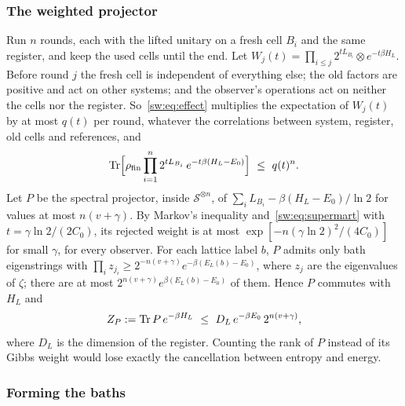 \subsubsection{The weighted projector}

Run $n$ rounds, each with the lifted unitary on a fresh cell $B_i$ and the same register, and keep the used cells until the end. Let $W_j(t)=\prod_{i\le j}2^{tL_{B_i}}\otimes e^{-t\beta H_L}$. Before round $j$ the fresh cell is independent of everything else; the old factors are positive and act on other systems; and the observer's operations act on neither the cells nor the register. So~\eqref{sw:eq:effect} multiplies the expectation of $W_j(t)$ by at most $q(t)$ per round, whatever the correlations between system, register, old cells and references, and
\begin{equation}\label{sw:eq:supermart}
\Tr\Bigl[\rho_{\mathrm{fin}}\prod_{i=1}^n2^{tL_{B_i}}\,e^{-t\beta(H_L-E_0)}\Bigr]\ \le\ q(t)^n.
\end{equation}
Let $P$ be the spectral projector, inside $\mathcal S^{\otimes n}$, of $\sum_iL_{B_i}-\beta(H_L-E_0)/\ln2$ for values at most $n(v+\gamma)$. By Markov's inequality and~\eqref{sw:eq:supermart} with $t=\gamma\ln2/(2C_0)$, its rejected weight is at most $\exp[-n(\gamma\ln2)^2/(4C_0)]$ for small $\gamma$, for every observer. For each lattice label $b$, $P$ admits only bath eigenstrings with $\prod_iz_{j_i}\ge2^{-n(v+\gamma)}e^{-\beta(E_L(b)-E_0)}$, where $z_j$ are the eigenvalues of $\zeta$; there are at most $2^{n(v+\gamma)}e^{\beta(E_L(b)-E_0)}$ of them. Hence $P$ commutes with $H_L$ and
\begin{equation}\label{sw:eq:gibbsvolume}
Z_P:=\operatorname{Tr} P\,e^{-\beta H_L}\ \le\ D_L\,e^{-\beta E_0}\,2^{n(v+\gamma)},
\end{equation}
where $D_L$ is the dimension of the register. Counting the rank of $P$ instead of its Gibbs weight would lose exactly the cancellation between entropy and energy.

\subsubsection{Forming the baths}

